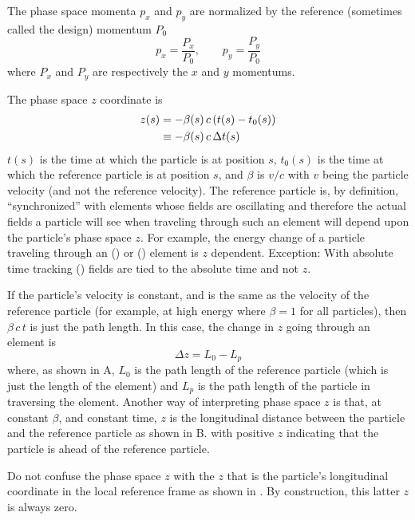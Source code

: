 The phase space momenta $p_x$ and $p_y$ are normalized by the reference (sometimes called the
design) momentum $P_0$
\begin{equation}
  p_x = \frac{P_x}{P_0}, \qquad
  p_y = \frac{P_y}{P_0}
  \label{ppp}
\end{equation}
where $P_x$ and $P_y$ are respectively the $x$ and $y$ momentums.

The phase space $z$ coordinate is 
\begin{align}
  z(s) &= -\beta(s) \, c \, (t(s) - t_0(s)) \nonumber \\
    &\equiv - \beta(s) \, c \, \Delta t(s)
  \label{zbctt}
\end{align}
$t(s)$ is the time at which the particle is at position $s$, $t_0(s)$ is the time at which the
reference particle is at position $s$, and $\beta$ is $v/c$ with $v$ being the particle velocity
(and not the reference velocity). The reference particle is, by definition, ``synchronized'' with
elements whose fields are oscillating and therefore the actual fields a particle will see when
traveling through such an element will depend upon the particle's phase space $z$. For example, the
energy change of a particle traveling through an  () or 
() element is $z$ dependent. Exception: With absolute time tracking ()
fields are tied to the absolute time and not $z$.

If the particle's velocity is constant, and is the same as the velocity of the reference particle
(for example, at high energy where $\beta = 1$ for all particles), then $\beta \, c \, t$ is just
the path length. In this case, the change in $z$ going through an element is
\begin{equation}
  \Delta z = L_0 - L_p
\end{equation}
where, as shown in A, $L_0$ is the path length of the reference particle (which
is just the length of the element) and $L_p$ is the path length of the particle in traversing the
element.  Another way of interpreting phase space $z$ is that, at constant $\beta$, and constant
time, $z$ is the longitudinal distance between the particle and the reference particle as shown in
B. with positive $z$ indicating that the particle is ahead of the reference
particle.

Do not confuse the phase space $z$ with the $z$ that is the particle's longitudinal coordinate in
the local reference frame as shown in . By construction, this latter $z$ is
always zero.

